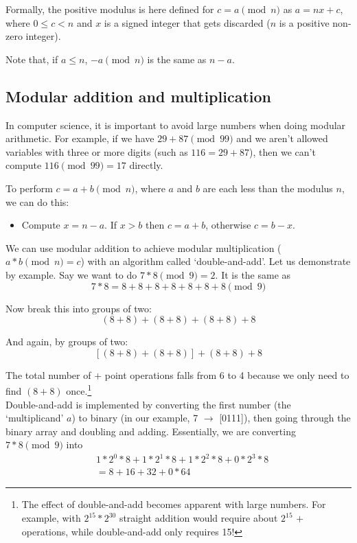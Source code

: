 Formally, the positive modulus is here defined for $c = a \pmod n$ as $a = n x + c$, where $0\leq{c}<{n}$ and $x$ is a signed integer that gets discarded ($n$ is a positive non-zero integer).

Note that, if $a \leq n$, $-a \pmod n$ is the same as $n - a$.


\subsection{Modular addition and multiplication}
\label{subsec:modular-addition-multiplication}

In computer science, it is important to avoid large numbers when doing modular arithmetic. For example, if we have $29+87 \pmod{99}$ and we aren't allowed variables with three or more digits (such as $116 = 29+87$), then we can't compute $116 \pmod{99} = 17$ directly.

To perform $c = a+b \pmod n$, where $a$ and $b$ are each less than the modulus $n$, we can do this:
\begin{itemize}
	\item Compute $x = n-a$. If $x > b$ then $c = a+b$, otherwise $c = b - x$.
\end{itemize}

We can use modular addition to achieve modular multiplication ($a*b \pmod n = c$) with an algorithm called `double-and-add'. Let us demonstrate by example. Say we want to do $7*8 \pmod 9 = 2$. It is the same as 
\[7*8 = 8+8+8+8+8+8+8 \pmod 9\]

Now break this into groups of two:
\[(8+8) + (8+8) + (8+8) + 8\]

And again, by groups of two:
\[[(8+8) + (8+8)] + (8+8) + 8\]

The total number of $+$ point operations falls from 6 to 4 because we only need to find $(8+8)$ once.\footnote{The effect of double-and-add becomes apparent with large numbers. For example, with $2^{15} * 2^{30}$ straight addition would require about $2^{15}$ $+$ operations, while double-and-add only requires 15!}\\

Double-and-add is implemented by converting the first number (the `multiplicand' $a$) to binary (in our example, 7 $\rightarrow$ [0111]), then going through the binary array and doubling and adding. Essentially, we are converting $7*8 \pmod{9}$ into\vspace{.155cm}
\begin{align*}
    &1*2^0*8 + 1*2^1*8 + 1*2^2*8 + 0*2^3*8\\
    &= 8 + 16 + 32 + 0*64
\end{align*}

